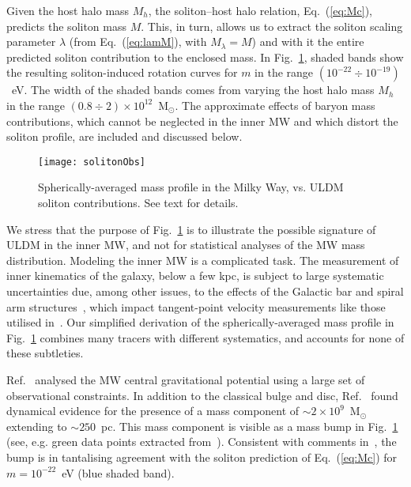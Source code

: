 \documentclass[aps,prd,floats,superscriptaddress,showpacs,nofootinbib,twocolumn,preprintnumbers]{revtex4-1}%
\begin{document}
Given the host halo mass $M_h$, the soliton--host halo relation, Eq.~(\ref{eq:Mc}), predicts the soliton mass $M$. This, in turn, allows us to extract the soliton scaling parameter $\lambda$ (from Eq.~(\ref{eq:lamM}), with $M_\lambda=M$) and with it the entire predicted soliton contribution to the enclosed mass. In Fig.~\ref{fig:obs}, shaded bands show the resulting soliton-induced rotation curves for $m$ in the range
$(10^{-22}\div 10^{-19})$~eV. The width of the shaded bands comes from varying the host halo mass $M_h$ in the range $(0.8\div 2)\times10^{12}$~M$_\odot$. The approximate effects of baryon mass contributions, which cannot be neglected in the inner MW and which distort the soliton profile, are included and discussed below. 
%
\begin{figure}[hbp]
\centering
\texttt{[image: solitonObs]}
\caption{
Spherically-averaged mass profile in the Milky Way, vs. ULDM soliton contributions. 
See text for details. 
}\label{fig:obs}
\end{figure}
%

We stress that the purpose of Fig.~\ref{fig:obs} is to illustrate the
possible signature of ULDM in the inner MW, and not for statistical
analyses of the MW mass distribution. Modeling the inner MW is a
complicated task. The measurement of inner kinematics of the galaxy, 
below a few
kpc, is subject to large systematic uncertainties due, among other
issues, to the effects of the Galactic bar and spiral arm
structures~\cite{Chemin2015b}, which impact tangent-point velocity
measurements like those utilised
in~\cite{Sofue:2013kja,Sofue:2015xpa}. Our simplified derivation of
the spherically-averaged mass profile in Fig.~\ref{fig:obs} combines
many tracers with different systematics, and accounts for none of
these subtleties. 

Ref.~\cite{Portail:2016vei} analysed the MW central gravitational
potential using a large set of observational constraints. In addition
to the classical bulge and disc, Ref.~\cite{Portail:2016vei} found
dynamical evidence for the presence of a mass component of
$\sim2\times10^9$~M$_\odot$ extending to $\sim250$~pc. This mass
component is visible as a mass bump in Fig.~\ref{fig:obs} (see,
e.g. green data points extracted
from~\cite{Sofue:2013kja}). Consistent with comments
in~\cite{Schive:2014hza,Schive:2014dra}, the bump is in tantalising
agreement with the soliton prediction of Eq.~(\ref{eq:Mc}) for
$m=10^{-22}$~eV (blue shaded band).  
\end{document}

